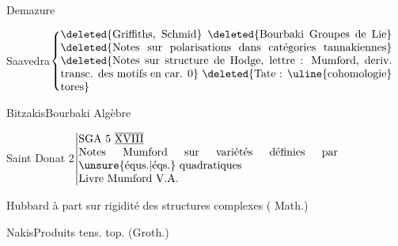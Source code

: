 








Demazure\qquad {}

Saavedra\quad \(\left\{\vcenter{\hbox{\begin{minipage}{.87\linewidth}
\deleted{Griffiths, Schmid}

\deleted{Bourbaki Groupes de Lie}

\deleted{Notes sur polarisations dans catégories tannakiennes}

\deleted{Notes sur structure de Hodge, lettre : Mumford, deriv. transc. des motifs en car. 0}

\deleted{Tate : \uline{cohomologie} tores}
\end{minipage}}}\right.\)

Bitzakis\qquad Bourbaki Algèbre





Saint Donat 2\qquad \(\left\vert\begin{array}{@{}p{.68\linewidth}@{}}SGA 5 $\overline{\underline{\mathrm{XVIII}}}$\\Notes Mumford sur variétés définies par \unsure{équs.|éqs.} quadratiques\\Livre Mumford V.A.\end{array}\right.\)

Hubbard\qquad {} à part sur rigidité des structures complexes ( Math.)

Nakis\qquad Produits tens. top. (Groth.)

\clearpage
